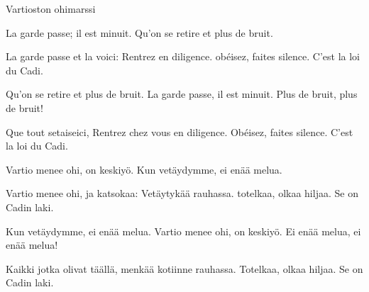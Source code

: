 \begin{song}{Vartioston ohimarssi}

	\repetitionbegin{}
	La garde passe; il est minuit.
	Qu'on se retire et plus de bruit.

	La garde passe et la voici:
	Rentrez en diligence.
	obéisez, faites silence.
	C'est la loi du Cadi.
	\repetitionend{}

	\repetitionbegin{}
	Qu'on se retire et plus de bruit.
	La garde passe, il est minuit.
	Plus de bruit, plus de bruit!

	Que tout setaiseici,
	Rentrez chez vous en diligence.
	Obéisez, faites silence.
	C'est la loi du Cadi.
	\repetitionend{}

	\repetitionbegin{}
	Vartio menee ohi, on keskiyö.
	Kun vetäydymme, ei enää melua.

	Vartio menee ohi, ja katsokaa:
	Vetäytykää rauhassa.
	totelkaa, olkaa hiljaa.
	Se on Cadin laki.
	\repetitionend{}

	\repetitionbegin{}
	Kun vetäydymme, ei enää melua.
	Vartio menee ohi, on keskiyö.
	Ei enää melua, ei enää melua!

	Kaikki jotka olivat täällä,
	menkää kotiinne rauhassa.
	Totelkaa, olkaa hiljaa.
	Se on Cadin laki.
	\repetitionend{}

\end{song}
